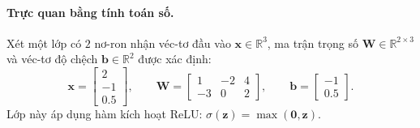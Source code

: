\paragraph{Trực quan bằng tính toán số.\\}
Xét một lớp có $2$ nơ-ron nhận véc-tơ đầu vào $\mathbf{x} \in \mathbb{R}^3$, ma trận trọng số $\mathbf{W} \in \mathbb{R}^{2 \times 3}$  và véc-tơ độ chệch $\mathbf{b} \in \mathbb{R}^2$ được xác định:
\[\mathbf{x} = \begin{bmatrix} 2 \\ -1 \\ 0.5 \end{bmatrix}, \qquad 
\mathbf{W} = \begin{bmatrix} 1 & -2 & 4 \\ -3 & 0 & 2 \end{bmatrix}, \qquad 
\mathbf{b} = \begin{bmatrix} -1 \\ 0.5 \end{bmatrix}.\]
Lớp này áp dụng hàm kích hoạt ReLU: $\sigma(\mathbf{z}) = \max(\mathbf{0}, \mathbf{z}).$

